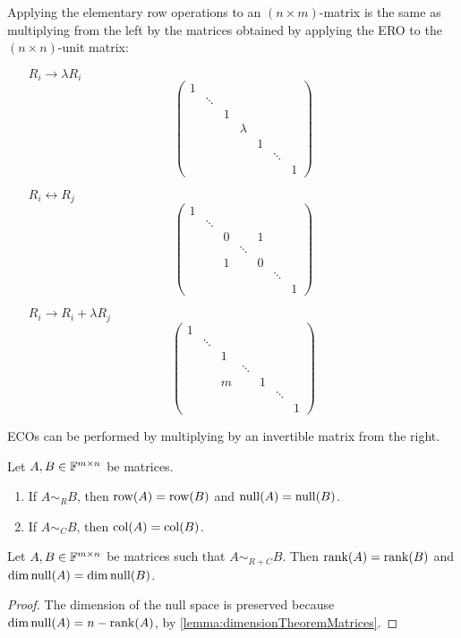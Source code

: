 \begin{lemma} \label{lemma:matricesEROs}
Applying the elementary row operations to an $(n\times m)$-matrix is the same as multiplying from the left by the matrices obtained by applying the ERO to the $(n\times n)$-unit matrix:
\begin{itemize}[leftmargin=3cm]
\item[$\boxed{R_i \to \lambda R_i}$]
\[ \begin{pmatrix}
1 &&&&&& \\
 & \ddots &&&&& \\ 
  & & 1 &&&& \\
 & &  & \lambda &&& \\
 & &  & & 1 && \\
 &&&&& \ddots & \\
 &&&&&& 1
\end{pmatrix} \]
\item[$\boxed{R_i \leftrightarrow R_j}$]
\[ \begin{pmatrix}1&&&&&&\\&\ddots &&&&&\\&&0&&1&&\\&&&\ddots &&&\\&&1&&0&&\\&&&&&\ddots &\\&&&&&&1\end{pmatrix} \]
\item[$\boxed{R_i \to R_i+ \lambda R_j}$]
\[ \begin{pmatrix}1&&&&&&\\&\ddots &&&&&\\&&1&&&&\\&&&\ddots &&&\\&&m&&1&&\\&&&&&\ddots &\\&&&&&&1\end{pmatrix} \]
\end{itemize}
\end{lemma}
\begin{corollary}
ECOs can be performed by multiplying by an invertible matrix from the right.
\end{corollary}
\begin{corollary}
Let $A,B\in\mathbb{F}^{m\times n}$ be matrices.
\begin{enumerate}
\item If $A\sim_R B$, then $\operatorname{row}(A) = \operatorname{row}(B)$ and $\operatorname{null}(A) = \operatorname{null}(B)$.
\item If $A\sim_C B$, then $\operatorname{col}(A) = \operatorname{col}(B)$.
\end{enumerate}
\end{corollary}
\begin{corollary}
Let $A,B\in\mathbb{F}^{m\times n}$ be matrices such that $A\sim_{R+C} B$. Then $\operatorname{rank}(A) = \operatorname{rank}(B)$ and $\dim\operatorname{null}(A) = \dim\operatorname{null}(B)$.
\end{corollary}
\begin{proof}
The dimension of the null space is preserved because $\dim\operatorname{null}(A) = n - \operatorname{rank}(A)$, by \ref{lemma:dimensionTheoremMatrices}.
\end{proof}

